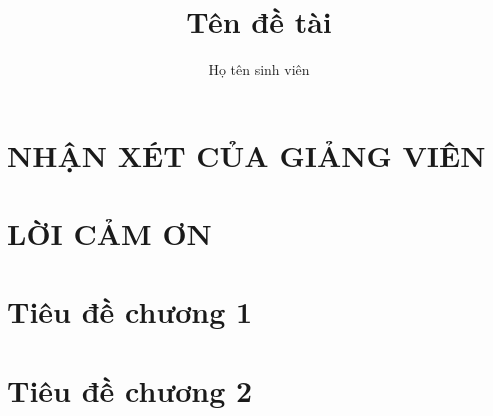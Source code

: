 \documentclass[a4paper,14pt,oneside]{extreport}
\title{Tên đề tài}						%
\author{Họ tên sinh viên}				%
\begin{document}


\chapter*{NHẬN XÉT CỦA GIẢNG VIÊN}


\chapter*{LỜI CẢM ƠN}


\tableofcontents
\listoffigures
\listoftables

\clearpage
{}			%
\chapter{Tiêu đề chương 1}

\chapter{Tiêu đề chương 2}


{}

\end{document}
